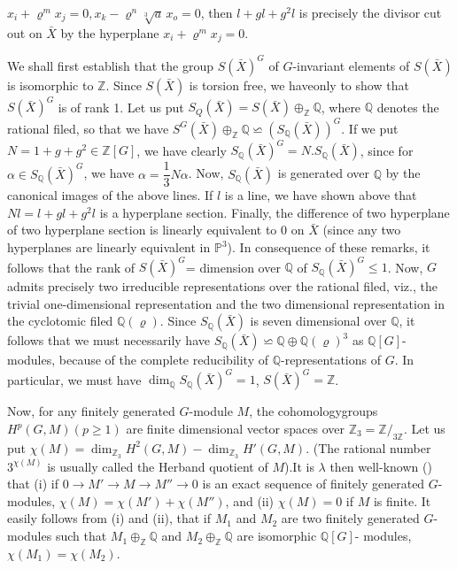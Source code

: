 $x_i + \varrho^m x_j =0,x_k - \varrho^n \sqrt[3]{a} \, x_o =0 $, then $l +
gl + g^2l$ is precisely the divisor cut out on $\bar{X}$ by the
hyperplane $x_i + \varrho^m x_j =0$. 

We shall first establish that the group $S(\bar{X})^G$ of $G$-invariant
elements of $S(\bar{X})$ is isomorphic to $\mathbb{Z}$. Since
$S(\bar{X})$ is torsion free, we have\pageoriginale only to show that
$S(\bar{X})^G$ is of rank 1. Let us put $S_Q (\bar{X}) = S(\bar{X})
\oplus_{\mathbb{Z}} \mathbb{Q}$, where $\mathbb{Q}$ denotes the
rational filed, so that we have $S^G(\bar{X}) \oplus_\mathbb{Z}
\mathbb{Q}\backsimeq (S_\mathbb{Q}(\bar{X}))^G$. If we put $N = 1
+g+g^2\in \mathbb{Z}[G]$, we have clearly $S_{\mathbb{Q}}(\bar{X})^G =
N. S_{\mathbb{Q}}(\bar{X})$, since for $\alpha \in S_{\mathbb{Q}}
(\bar{X})^G$, we have $\alpha =\dfrac{1}{3} N \alpha$. Now,
$S_{\mathbb{Q}}(\bar{X})$ is generated over $\mathbb{Q}$ by the
canonical images of the above lines. If $l$ is a line, we have shown
above that $Nl =l +gl + g^2 l$ is a hyperplane section. Finally, the
difference of two hyperplane of two hyperplane section is linearly
equivalent to $0$ on $\bar{X}$ (since any two hyperplanes are
linearly equivalent in $\mathbb{P}^3$). In consequence of these
remarks, it follows that the rank of $S(\bar{X})^G$= dimension over
$\mathbb{Q}$ of $S_{\mathbb{Q}}(\bar{X})^G \leq 1$. Now, $G$ admits
precisely two irreducible representations over the rational filed,
viz., the trivial one-dimensional representation and the two
dimensional representation in the cyclotomic filed
$\mathbb{Q}(\varrho)$. Since $S_{\mathbb{Q}}(\bar{X})$ is seven
dimensional over $\mathbb{Q}$, it follows that we must necessarily
have $S_{\mathbb{Q}}(\bar{X})\backsimeq \mathbb{Q} \oplus \mathbb{Q}
(\varrho)^3$ as $\mathbb{Q}[G]$-modules, because of the complete
reducibility of $\mathbb{Q}$-representations of $G$. In particular, we
must have $\dim_\mathbb{Q} S_\mathbb{Q}(\bar{X})^G = 1$, $S(\bar{X})^G
= \mathbb{Z}$. 

Now, for any finitely generated $G$-module $M$, the cohomology\break groups
$H^p (G,M) (p \geq 1)$ are finite dimensional vector spaces over
$\mathbb{Z}_3 = \mathbb{Z}/_{3 \mathbb{Z}}$. Let us put $\chi (M) =
\dim _{\mathbb{Z}_3}H^2(G,M) - \dim_{\mathbb{Z}_3} H' (G,M)$. (The
rational number $3^{\chi (M)}$ is 
usually called the Herband quotient of $M$).\pageoriginale It is $\lambda$ then
well-known (\cite{key21}) that (i) if $0 \to M' \to M \to M'' \to 0$ is an
exact sequence of finitely generated $G$-modules, $\chi(M) = \chi (M')
+ \chi (M'')$, and (ii) $\chi (M) =0$ if $M$ is finite. It easily
follows from (i) and (ii), that if $M_1$ and $M_2$ are two
finitely generated $G$-modules such that $M_1 \oplus_\mathbb{Z}
\mathbb{Q}$ and $M_2 \oplus_\mathbb{Z} \mathbb{Q}$ are isomorphic
$\mathbb{Q}[G]$- modules, $\chi (M_1)= \chi (M_2)$. 

